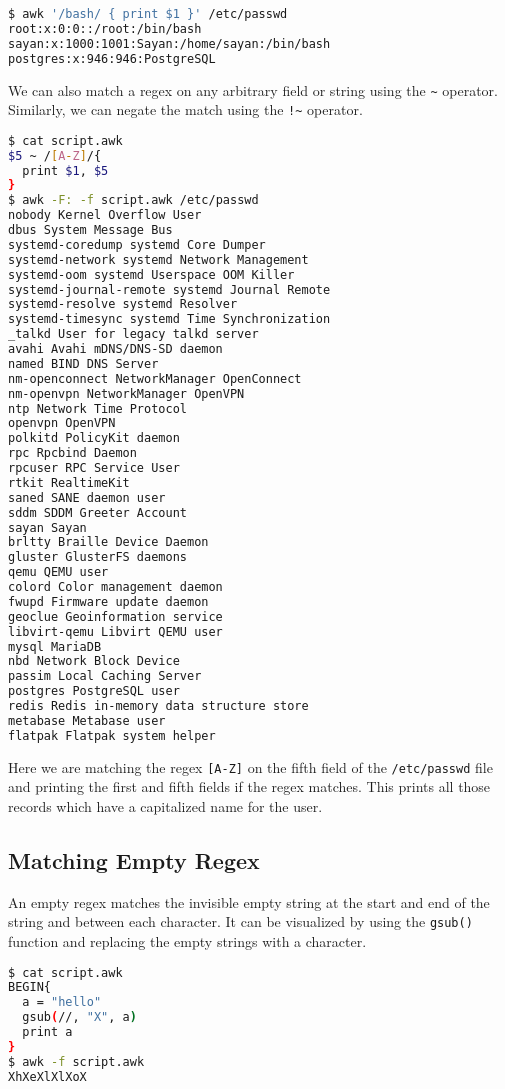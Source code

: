\begin{lstlisting}[language=bash]
$ awk '/bash/ { print $1 }' /etc/passwd
root:x:0:0::/root:/bin/bash
sayan:x:1000:1001:Sayan:/home/sayan:/bin/bash
postgres:x:946:946:PostgreSQL
\end{lstlisting}

We can also match a regex on any arbitrary field or string using the \lstinline|~| operator.
Similarly, we can negate the match using the \lstinline|!~| operator.

\begin{lstlisting}[language=bash]
$ cat script.awk
$5 ~ /[A-Z]/{
  print $1, $5
}
$ awk -F: -f script.awk /etc/passwd
nobody Kernel Overflow User
dbus System Message Bus
systemd-coredump systemd Core Dumper
systemd-network systemd Network Management
systemd-oom systemd Userspace OOM Killer
systemd-journal-remote systemd Journal Remote
systemd-resolve systemd Resolver
systemd-timesync systemd Time Synchronization
_talkd User for legacy talkd server
avahi Avahi mDNS/DNS-SD daemon
named BIND DNS Server
nm-openconnect NetworkManager OpenConnect
nm-openvpn NetworkManager OpenVPN
ntp Network Time Protocol
openvpn OpenVPN
polkitd PolicyKit daemon
rpc Rpcbind Daemon
rpcuser RPC Service User
rtkit RealtimeKit
saned SANE daemon user
sddm SDDM Greeter Account
sayan Sayan
brltty Braille Device Daemon
gluster GlusterFS daemons
qemu QEMU user
colord Color management daemon
fwupd Firmware update daemon
geoclue Geoinformation service
libvirt-qemu Libvirt QEMU user
mysql MariaDB
nbd Network Block Device
passim Local Caching Server
postgres PostgreSQL user
redis Redis in-memory data structure store
metabase Metabase user
flatpak Flatpak system helper
\end{lstlisting}

Here we are matching the regex \lstinline|[A-Z]| on the fifth field of the \lstinline|/etc/passwd| file and printing the first and fifth fields if the regex matches. This prints all those records which have a capitalized name for the user.

\subsection{Matching Empty Regex}

An empty regex matches the invisible empty string at the start and end of the string and between each character. It can be visualized by using the \lstinline|gsub()| function and replacing the empty strings with a character.

\begin{lstlisting}[language=bash]
$ cat script.awk
BEGIN{
  a = "hello"
  gsub(//, "X", a)
  print a
}
$ awk -f script.awk
XhXeXlXlXoX
\end{lstlisting}

